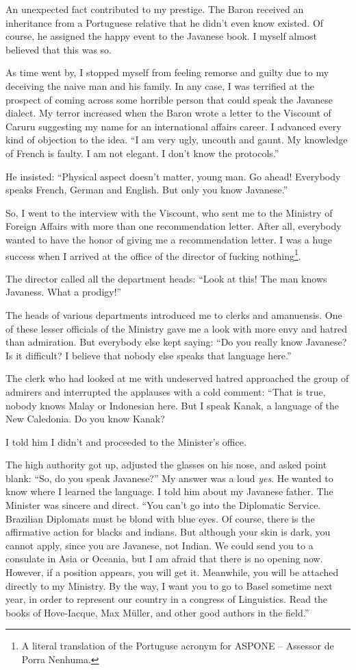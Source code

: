 \documentclass[a4paper,12pt]{book}
\begin{document}
An unexpected fact contributed to my
prestige. The Baron received an inheritance
from a Portuguese relative that he  didn't
even know existed. Of course, he assigned the
happy event to the Javanese book.
I myself almost believed that this was so.

As time went by, I stopped myself from
feeling remorse and guilty due to my deceiving
the naive man and his family. In any case,
I was terrified at the prospect of coming
across some horrible person that could
speak the Javanese dialect. My terror
increased when the Baron wrote a letter
to the Viscount of Caruru suggesting my
name for an international affairs career.
I advanced every kind of objection to the
idea. ``I am very ugly, uncouth and gaunt.
My knowledge of French
is faulty. I am not elegant.
I don't know the protocols.''

He insisted: ``Physical aspect doesn't matter, young man.
Go ahead! Everybody speaks French, German and English.
But only you know Javanese.''

So, I went to the interview with the Viscount,
who sent me to the Ministry of Foreign Affairs
with more than one recommendation letter.
After all, everybody wanted to have the
honor of giving me a recommendation letter.
I was a huge success when I arrived at
the office of the director
of fucking nothing\footnote{A literal translation
of the Portuguse acronym for ASPONE -- Assessor de
Porra Nenhuma.}.

The director called all the department
heads: ``Look at this! The man
knows Javaness.  What a prodigy!''

The heads of various departments introduced me
to clerks and amanuensis.
One of these lesser officials of the Ministry
gave me a look with more envy and hatred than
admiration. But everybody else kept saying:
``Do you really know Javanese? Is it difficult?
I believe that nobody else speaks that language here.''

The clerk who had looked at me with undeserved
hatred approached the group of admirers and interrupted
the applauses with a cold comment: ``That is true,
nobody knows Malay or Indonesian here. But I speak
Kanak, a language of the New Caledonia. Do you
know Kanak?

I told him I didn't and proceeded
to the Minister's office.

The high authority got up, adjusted the
glasses on his nose, and asked point blank:
``So, do you speak Javanese?''
My answer was a loud {\em yes}.
He wanted to know where I learned the
language. I told him about my Javanese father.
The Minister was sincere and direct.
``You can't go into the Diplomatic Service.
Brazilian Diplomats must be blond with
blue eyes. Of course, there is the affirmative
action for blacks and indians. But although
your skin is dark, you cannot apply,
since you are Javanese, not Indian.
We could send you to a consulate in
Asia or Oceania, but I am afraid
that there is no opening now.
However, if a position appears, you will
get it. Meanwhile, you will be attached directly
to my Ministry. By the way,
I want you to go 
to Basel sometime next year, in order
to represent our country in a congress
of Linguistics. Read the books of
Hove-Iacque, Max Müller, and other
good authors in the field.''
\end{document}
